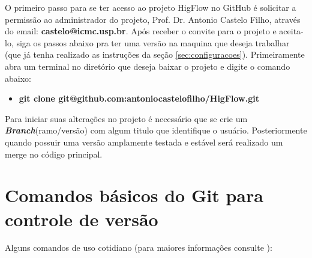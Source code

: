\documentclass[12pt]{article}
\begin{document}
O primeiro passo para se ter acesso ao projeto HigFlow no GitHub é solicitar a permissão ao administrador do projeto, Prof. Dr. Antonio Castelo Filho, através do email: \textbf{castelo@icmc.usp.br}. Após receber o convite para o projeto e aceita-lo, siga os passos abaixo pra ter uma versão na maquina que deseja trabalhar (que já tenha realizado as instruções da seção \ref{sec:configuracoes}). Primeiramente abra um terminal no diretório que deseja baixar o projeto e digite o comando abaixo:
\begin{itemize}	
	\item \textbf{git clone git@github.com:antoniocastelofilho/HigFlow.git}
\end{itemize}

Para iniciar suas alterações no projeto é necessário que se crie um \textit{\textbf{Branch}}(ramo/versão) com algum titulo que identifique o usuário. Posteriormente quando possuir uma versão amplamente testada e estável será realizado um merge no código principal.

\section{Comandos básicos do Git para controle de versão}\label{sec:comandos_pc}

Alguns comandos de uso cotidiano (para maiores informações consulte \cite{site3}):
\end{document}
